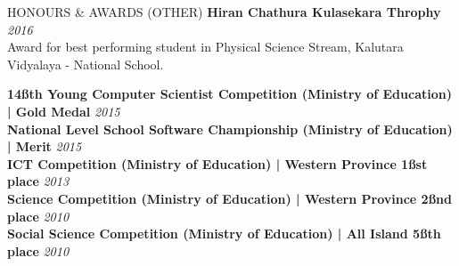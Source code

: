 \documentclass{cv}
\begin{document}
\begin{rSection}{HONOURS \& AWARDS (OTHER)}
    {\bf Hiran Chathura Kulasekara Throphy}                                                         \hfill {\em 2016}
    \\Award for best performing student in Physical Science Stream, Kalutara Vidyalaya - National School. \par
    {\bf 14\ss{th} Young Computer Scientist Competition (Ministry of Education) | Gold Medal}     \hfill {\em 2015} \\
    {\bf National Level School Software Championship (Ministry of Education) | Merit}     \hfill {\em 2015} \\
    {\bf ICT Competition (Ministry of Education) | Western Province 1\ss{st} place}      \hfill {\em 2013}\\
    {\bf Science Competition (Ministry of Education) | Western Province 2\ss{nd} place}   \hfill {\em 2010}\\
    {\bf Social Science Competition (Ministry of Education) | All Island 5\ss{th} place}  \hfill {\em 2010}\par
\end{rSection}

\end{document}
